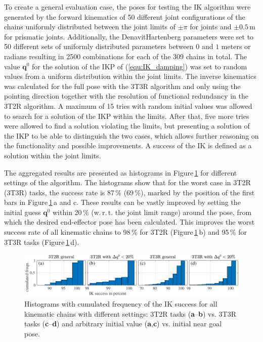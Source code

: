\documentclass[robotics,article,accept,moreauthors,pdftex]{Definitions/mdpi}
\newcommand{\bm}[1]{\boldsymbol{#1}}
\begin{document}
To create a general evaluation case, the poses for testing the IK algorithm were generated by the forward kinematics of 50 different joint configurations of the chains uniformly distributed between the joint limits of $\pm \pi$ for  joints and $\pm0.5\,\mathrm{m}$ for prismatic joints.
Additionally, the Denavit\added[id=Sp]{--}Hartenberg parameters were set to 50 different sets of uniformly distributed parameters between $0$ and $1$ meters or radians resulting in 2500 combinations for each of the 309 chains in total.
The  value $\bm{q}^0$ for the solution of the IKP of (\ref{equ:IK_damping}) was set to random values from a uniform distribution within the joint limits.
The inverse kinematics was calculated for the full pose with the 3T3R algorithm and only using the pointing direction together with the resolution of functional redundancy in the 3T2R algorithm.
%
A maximum of 15 tries with random initial values was allowed to search for a solution of the IKP within the limits.
After that, five more tries were allowed to find a solution violating the limits, but presenting a solution of the IKP to be able to distinguish the two cases, which allows further reasoning on the functionality and possible improvements.
A success of the IK is defined as a solution within the joint limits.

The aggregated results are presented as histograms in Figure\,\ref{fig:serrob_ik_hist_cdf} for different settings of the algorithm.
The histograms show that for the worst case in 3T2R (3T3R) tasks, the success rate is 87\,\% (69\,\%), marked by the position of the first bars in Figure\,\ref{fig:serrob_ik_hist_cdf}\,a and c.
These results can be vastly improved by setting the initial guess $\bm{q}^0$ within 20\,\% (w.\,r.\,t. the joint limit range) around the pose, from which the desired end-effector pose has been calculated.
This improves the worst success rate of all kinematic chains to 98\,\% for 3T2R (Figure\,\ref{fig:serrob_ik_hist_cdf}\,b) and 95\,\% for 3T3R tasks (Figure\,\ref{fig:serrob_ik_hist_cdf}\,d).


%
\begin{figure}[H]
    \includegraphics{serrob_ik_hist_cdf_all.pdf}
    \caption{Histograms with cumulated frequency of the IK success for all kinematic chains with different settings: 3T2R tasks (\textbf{a}--\textbf{b}) vs. 3T3R tasks (\textbf{c}--\textbf{d}) and arbitrary initial value (\textbf{a},\textbf{c}) vs. initial near goal pose.}
    \label{fig:serrob_ik_hist_cdf}
\end{figure} 
%
\end{document}
